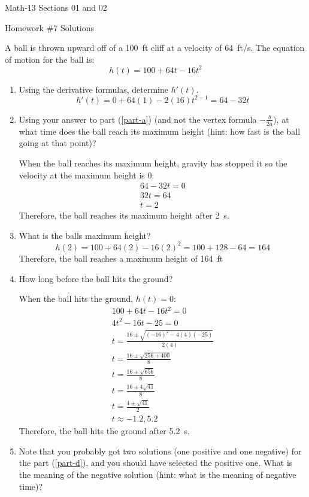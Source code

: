 \documentclass[letterpaper,12pt,fleqn]{article}
\begin{document}
\begin{center}
  \large
  Math-13 Sections 01 and 02

  \Large
  Homework \#7 Solutions
\end{center}

A ball is thrown upward off of a \SI{100}{ft} cliff at a velocity of \SI{64}{ft/s}.  The equation of motion for the
ball is:
\[h(t)=100+64t-16t^2\]
\begin{enumerate}[left=0in]
\item\label{part-a} Using the derivative formulas, determine \(h'(t)\).
  \[h'(t)=0+64(1)-2(16)t^{2-1}=64-32t\]
\item Using your answer to part (\ref{part-a}) (and not the vertex formula \(-\frac{b}{2a}\)), at what time does the
  ball reach its maximum height (hint: how fast is the ball going at that point)?

  When the ball reaches its maximum height, gravity has stopped it so the velocity at the maximum height is 0:
  \begin{gather*}
    64-32t=0 \\
    32t=64 \\
    t=2
  \end{gather*}
  Therefore, the ball reaches its maximum height after \SI{2}{s}.

\item What is the balls maximum height?
  \[h(2)=100+64(2)-16(2)^2=100+128-64=164\]
  Therefore, the ball reaches a maximum height of \SI{164}{ft}

\item\label{part-d} How long before the ball hits the ground?

  When the ball hits the ground, \(h(t)=0\):
  \begin{gather*}
    100+64t-16t^2=0 \\
    4t^2-16t-25=0 \\
    t=\frac{16\pm\sqrt{(-16)^2-4(4)(-25)}}{2(4)} \\
    t=\frac{16\pm\sqrt{256+400}}{8} \\
    t=\frac{16\pm\sqrt{656}}{8} \\
    t=\frac{16\pm4\sqrt{41}}{8} \\
    t=\frac{4\pm\sqrt{41}}{2} \\
    t\approx-1.2,5.2
  \end{gather*}
  Therefore, the ball hits the ground after \SI{5.2}{s}.
  
\item Note that you probably got two solutions (one positive and one negative) for the part (\ref{part-d}), and you
  should have selected the positive one.  What is the meaning of the negative solution (hint: what is the meaning
  of negative time)?


\end{enumerate}
\end{document}
